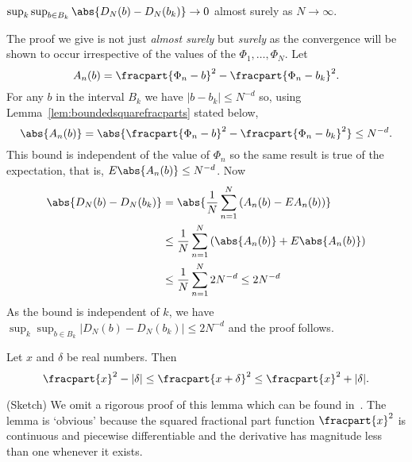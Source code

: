 \documentclass[journal]{IEEEtran}
\begin{document}
\begin{lemma}\label{lem:DNoverBij->0}
$\sup_{k }\sup_{b \in B_k}\abs{D_N(b) - D_N(b_k)} \rightarrow 0$ almost surely as $N\rightarrow \infty$.
 \end{lemma}
\begin{IEEEproof}
The proof we give is not just \emph{almost surely} but \emph{surely} as the convergence will be shown to occur irrespective of the values of the $\Phi_1, \dots, \Phi_N$.  Let 
\[ 
A_n(b) = \fracpart{\Phi_n - b}^2 - \fracpart{\Phi_n - b_k}^2.
\]
For any $b$ in the interval $B_k$ we have $|b - b_k| \leq N^{-d}$ so, using Lemma~\ref{lem:boundedsquarefracparts} stated below,
\[
\abs{A_n(b)} =  \abs{\fracpart{\Phi_n - b}^2 - \fracpart{\Phi_n - b_k}^2} \leq N^{-d}.
\]
This bound is independent of the value of $\Phi_n$ so the same result is true of the expectation, that is, $E\abs{A_n(b)} \leq N^{-d}$.  Now
\begin{align*}
\abs{D_N(b) - D_N(b_k)} &= \abs{ \frac{1}{N}\sum_{n=1}^{N} \left( A_n(b) - EA_n(b) \right) } \\
&\leq \frac{1}{N}\sum_{n=1}^{N} \left( \abs{ A_n(b) } + E\abs{A_n(b)} \right)  \\ 
&\leq \frac{1}{N}\sum_{n=1}^{N} 2N^{-d} \leq 2N^{-d}
\end{align*}
As the bound is independent of $k$, we have $\sup_{k}\sup_{ b  \in B_k }\left\vert D_N(b) - D_N(b_k)\right\vert \leq 2N^{-d}$ and the proof follows.
\end{IEEEproof}

\begin{lemma}\label{lem:boundedsquarefracparts}
Let $x$ and $\delta$ be real numbers.  Then
\[
\fracpart{x}^2 - |\delta| \leq \fracpart{x + \delta}^2 \leq \fracpart{x}^2 + |\delta|.
\]
\end{lemma}
\begin{IEEEproof} (Sketch)
We omit a rigorous proof of this lemma which can be found in~\cite[Lemma~8.4]{McKilliam2010thesis}. The lemma is `obvious' because the squared fractional part function $\fracpart{x}^2$ is continuous and piecewise differentiable and the derivative has magnitude less than one whenever it exists.
\end{IEEEproof}
\end{document}
